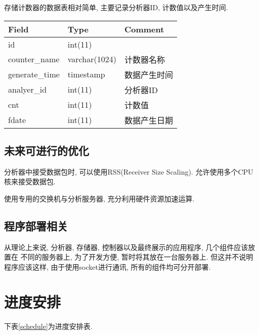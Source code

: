 {\begin{mdframed}[everyline=true]
存储计数器的数据表相对简单, 主要记录分析器ID, 计数值以及产生时间.

\begin{center}
    \label{tbl_counter}
    \begin{tabular}{lll} \hline
    Field          & Type          & Comment \\ \hline
    id             & int(11)       &         \\
    counter\_name  & varchar(1024) & 计数器名称   \\
    generate\_time & timestamp     & 数据产生时间  \\
    analyer\_id    & int(11)       & 分析器ID   \\
    cnt            & int(11)       & 计数值     \\
    fdate          & int(11)       & 数据产生日期  \\ \hline
    \end{tabular}
\end{center}



\subsection{未来可进行的优化}

分析器中接受数据包时, 可以使用RSS(Receiver Size Scaling).
允许使用多个CPU 核来接受数据包.

使用专用的交换机与分析服务器, 充分利用硬件资源加速运算.

\subsection{程序部署相关}

从理论上来说, 分析器, 存储器, 控制器以及最终展示的应用程序,
几个组件应该放置在 不同的服务器上, 为了开发方便,
暂时将其放在一台服务器上. 但这并不说明程序应该这样,
由于使用socket进行通讯, 所有的组件均可分开部署.

\section{进度安排}

 下表\ref{schedule}为进度安排表.

\begin{centering}
\centering
    \label{schedule}


\end{centering}
\end{mdframed}}
